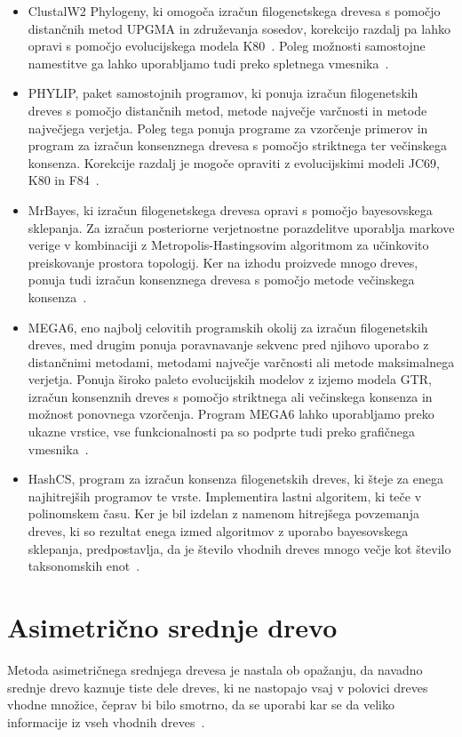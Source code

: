 \documentclass[a4paper, 12pt]{book}
\begin{document}
\begin{itemize}
	\item ClustalW2 Phylogeny, ki omogoča izračun filogenetskega drevesa s 
		 po\-moč\-jo distančnih metod UPGMA in združevanja sosedov, korekcijo 
		 razdalj pa lahko opravi s pomočjo evolucijskega modela K80~\cite{clustalw2}. 
	      Poleg možnosti samostojne namestitve ga lahko uporabljamo tudi 
	      preko spletnega vmesnika~\cite{clustalw2_phylogeny}.
	\item PHYLIP, paket samostojnih programov, ki ponuja izračun filogenetskih dreves 
		  s pomočjo distančnih metod, metode največje varčnosti in metode največjega 
		  verjetja. Poleg tega ponuja programe za vzorčenje primerov in program
	      za izračun konsenznega drevesa s pomočjo striktnega ter večinskega konsenza. 
	      Korekcije razdalj je mogoče opraviti z evolucijskimi modeli JC69, K80 in F84~\cite{phylip}.
	\item MrBayes, ki izračun filogenetskega drevesa opravi s pomočjo bayesovskega sklepanja. 
		  Za izračun posteriorne verjetnostne porazdelitve uporablja markove verige v 
		  kombinaciji z Metropolis-Hastingsovim algoritmom za učinkovito preiskovanje 
	      prostora topologij. Ker na izhodu proizvede mnogo dreves, ponuja tudi 
	      izračun konsenznega drevesa s pomočjo metode večinskega konsenza~\cite{mrbayes}.
	\item MEGA6, eno najbolj celovitih programskih okolij za izračun filogenetskih 
		  dreves, med drugim ponuja poravnavanje sekvenc pred njihovo uporabo z 
		  distančnimi metodami, metodami največje varčnosti ali metode maksimalnega
	       verjetja. Ponuja široko paleto evolucijskih modelov z izjemo modela GTR, 
	       izračun konsenznih dreves s pomočjo striktnega ali večinskega konsenza 
	       in možnost ponovnega vzorčenja. Program MEGA6 lahko uporabljamo preko ukazne
	       vrstice, vse funkcionalnosti pa so podprte tudi preko grafičnega vmesnika~\cite{mega6}. 
	\item HashCS, program za izračun konsenza filogenetskih dreves, ki šteje za 
		  enega najhitrejših programov te vrste. Implementira lastni algoritem, ki 
		  teče v polinomskem času. Ker je bil izdelan z namenom hitrejšega povzemanja 
		  dreves, ki so rezultat enega izmed algoritmov z uporabo bayesovskega sklepanja, 
		  predpostavlja, da je število vhodnih dreves mnogo večje kot število 
		  taksonomskih enot~\cite{hashcs}.
\end{itemize} 

\chapter{Asimetrično srednje drevo}
Metoda asimetričnega srednjega drevesa je nastala ob opažanju, da navadno srednje 
drevo kaznuje tiste dele dreves, ki ne nastopajo vsaj v polovici dreves vhodne množice, 
čeprav bi bilo smotrno, da se uporabi kar se da veliko informacije iz vseh vhodnih 
dreves~\cite{pw}.
\end{document}

